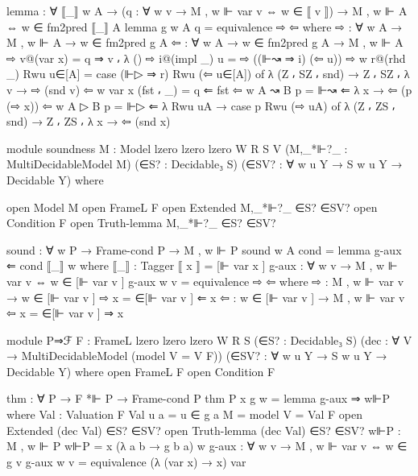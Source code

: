 \begin{spverbatim}
  lemma : ∀ {⟦_⟧ w A} → (q : ∀ {w v} → M , w ⊩ var v ⇔ w ∈ ⟦ v ⟧) →
    M , w ⊩ A ⇔ w ∈ fm2pred ⟦_⟧ A
  lemma {g} {w} {A} q = equivalence ⇨ ⇦
    where
    ⇨ : ∀ {w A} → M , w ⊩ A → w ∈ fm2pred g A
    ⇦ : ∀ {w A} → w ∈ fm2pred g A → M , w ⊩ A
    ⇨ v@(var x) = q ⇒ v ⸴ λ ()
    ⇨ i@(impl _) u = ⇨ ((⊩↝ ⇒ i) (⇦ u))
    ⇨ {w} r@(rhd _) Rwu u∈[A] = case (⊩▷ ⇒ r) Rwu (⇦ u∈[A]) of
      λ { (Z ⸴ SZ ⸴ snd) → Z ⸴ SZ ⸴ λ {v → ⇨ (snd v)}}
    ⇦ {w} {var x} (fst ⸴ _) = q ⇐ fst
    ⇦ {w} {A ↝ B} p = ⊩↝ ⇐ λ {x → ⇦ (p (⇨ x))}
    ⇦ {w} {A ▷ B} p = ⊩▷ ⇐ λ {Rwu uA → case p Rwu (⇨ uA) of
      λ { (Z ⸴ ZS ⸴ snd) → Z ⸴ ZS ⸴ λ {x → ⇦ (snd x)}}}


module soundness
  {M : Model {lzero} {lzero} {lzero} W R S V}
  (M,_*⊩?_ : MultiDecidableModel M)
  (∈S? : Decidable₃ S)
  (∈SV? : ∀ {w u Y} → S w u Y → Decidable Y) where

  open Model M
  open FrameL F
  open Extended M,_*⊩?_ ∈S? ∈SV?
  open Condition F
  open Truth-lemma M,_*⊩?_ ∈S? ∈SV?

  sound : ∀ w P → Frame-cond P → M , w ⊩ P
  sound w A cond = lemma g-aux ⇐ cond ⟦_⟧ w
    where
    ⟦_⟧ : Tagger
    ⟦ x ⟧ = [⊩ var x ]
    g-aux : ∀ {w v} → M , w ⊩ var v ⇔ w ∈ [⊩ var v ]
    g-aux {w} {v} = equivalence ⇨ ⇦
      where
      ⇨ : M , w ⊩ var v → w ∈ [⊩ var v ]
      ⇨ x = ∈[⊩ var v ] ⇐ x
      ⇦ : w ∈ [⊩ var v ] → M , w ⊩ var v
      ⇦ x = ∈[⊩ var v ] ⇒ x


module P⇒ℱ
  {F : FrameL {lzero} {lzero} {lzero} W R S}
  (∈S? : Decidable₃ S)
  (dec : ∀ V → MultiDecidableModel (model {V = V} F))
  (∈SV? : ∀ {w u Y} → S w u Y → Decidable Y)
  where
  open FrameL F
  open Condition F

  thm : ∀ P → F *⊩ P → Frame-cond P
  thm P x g w = lemma g-aux ⇒ w⊩P
    where
    Val : Valuation F
    Val u a = u ∈ g a
    M = model {V = Val} F
    open Extended (dec Val) ∈S? ∈SV?
    open Truth-lemma (dec Val) ∈S? ∈SV?
    w⊩P : M , w ⊩ P
    w⊩P = x (λ a b → g b a) w
    g-aux : ∀ {w v} → M , w ⊩ var v ⇔ w ∈ g v
    g-aux {w} {v} = equivalence (λ { (var x) → x}) var
\end{spverbatim}
